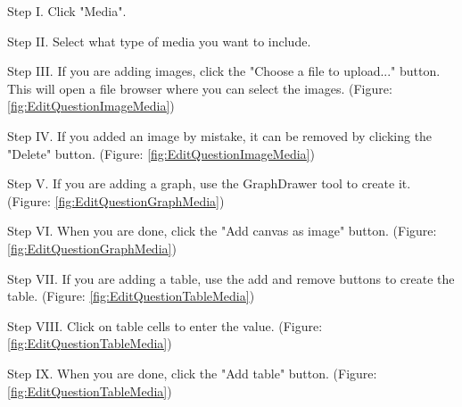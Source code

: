\begin{userManualItemlist}
    \item[Step I.] Click "Media".
    \item[Step II.] Select what type of media you want to include.
    \item[Step III.] If you are adding images, click the "Choose a file to upload..." button. This will open a file browser where you can select the images. (Figure: \ref{fig:EditQuestionImageMedia})
    \item[Step IV.] If you added an image by mistake, it can be removed by clicking the "Delete" button. (Figure: \ref{fig:EditQuestionImageMedia})
    \item[Step V.] If you are adding a graph, use the GraphDrawer tool to create it. (Figure: \ref{fig:EditQuestionGraphMedia})
    \item[Step VI.] When you are done, click the "Add canvas as image" button. (Figure: \ref{fig:EditQuestionGraphMedia})
    \item[Step VII.] If you are adding a table, use the add and remove buttons to create the table. (Figure: \ref{fig:EditQuestionTableMedia})
    \item[Step VIII.] Click on table cells to enter the value. (Figure: \ref{fig:EditQuestionTableMedia})
    \item[Step IX.] When you are done, click the "Add table" button. (Figure: \ref{fig:EditQuestionTableMedia})
\end{userManualItemlist}
